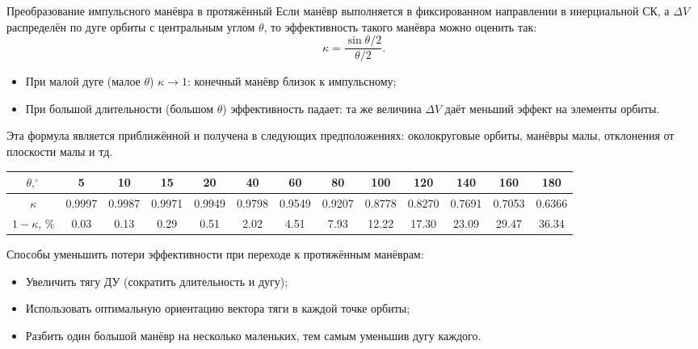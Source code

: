 \documentclass[8pt]{beamer}
\begin{document}
\begin{frame}{Преобразование импульсного манёвра в протяжённый}
Если манёвр выполняется в фиксированном направлении в инерциальной СК, а $\Delta V$ распределён по дуге орбиты с центральным углом $\theta$, то эффективность такого манёвра можно оценить так:
\begin{equation*}
    \kappa = \frac{\sin \theta / 2}{\theta / 2}.
\end{equation*}
\begin{itemize}
    \item При малой дуге (малое $\theta$) $\kappa \rightarrow 1$: конечный манёвр близок к импульсному;
    \item При большой длительности (большом $\theta$) эффективность падает: та же величина $\Delta V$ даёт меньший эффект на элементы орбиты.
\end{itemize}
Эта формула является приближённой и получена в следующих предположениях: околокруговые орбиты, манёвры малы, отклонения от плоскости малы и тд.
\begin{table}[h]
    \centering
    \scriptsize
    \begin{tabular}{|c|cccccccccccc|}
        \hline
        $\theta,^\circ$
            & 5 & 10 & 15 & 20 & 40 & 60 & 80 & 100 & 120 & 140 & 160 & 180 \\ \hline
        $\kappa$
            & 0.9997 & 0.9987 & 0.9971 & 0.9949
            & 0.9798 & 0.9549 & 0.9207 & 0.8778
            & 0.8270 & 0.7691 & 0.7053 & 0.6366 \\ \hline
        $1 - \kappa$, \%
            & 0.03 & 0.13 & 0.29 & 0.51
            & 2.02 & 4.51 & 7.93 & 12.22
            & 17.30 & 23.09 & 29.47 & 36.34 \\ \hline
    \end{tabular}
\end{table}
Способы уменьшить потери эффективности при переходе к протяжённым манёврам:
\begin{itemize}
    \item Увеличить тягу ДУ (сократить длительность и дугу);
    \item Использовать оптимальную ориентацию вектора тяги в каждой точке орбиты;
    \item Разбить один большой манёвр на несколько маленьких, тем самым уменьшив дугу каждого.
\end{itemize}
\end{frame}
\end{document}
